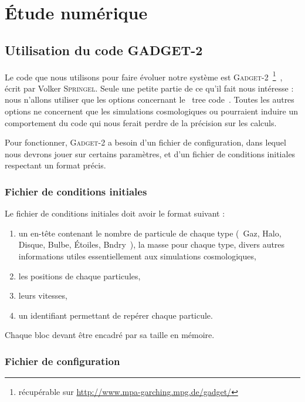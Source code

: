 \chapter{Étude numérique}
	\minitoc
	\section{Utilisation du code \textsc{GADGET-2}}

		Le code que nous utilisons pour faire évoluer notre système est
		\textsc{Gadget-2}~\footnote{récupérable sur
		\url{http://www.mpa-garching.mpg.de/gadget/}}~\cite{gadget2},
		écrit par Volker \textsc{Springel}. Seule une petite partie de
		ce qu'il fait nous intéresse : nous n'allons utiliser que les
		options concernant le \og~tree code~\fg. Toutes les autres
		options ne concernent que les simulations cosmologiques ou
		pourraient induire un comportement du code qui nous ferait
		perdre de la précision sur les calculs.

		Pour fonctionner, \textsc{Gadget-2} a besoin d'un fichier de
		configuration, dans lequel nous devrons jouer sur certains
		paramètres, et d'un fichier de conditions initiales respectant
		un format précis.

		\subsection{Fichier de conditions initiales}

			Le fichier de conditions initiales doit avoir le format suivant :
			\begin{enumerate}
				\item un en-tête contenant le nombre de particule de chaque type (~Gaz, Halo, Disque, Bulbe, Étoiles, Bndry~),
				la masse pour chaque type, divers autres informations utiles essentiellement aux simulations cosmologiques,
				\item les positions de chaque particules,
				\item leurs vitesses,
				\item un identifiant permettant de repérer chaque particule.
			\end{enumerate}
			Chaque bloc devant être encadré par sa taille en mémoire.

		\subsection{Fichier de configuration}

